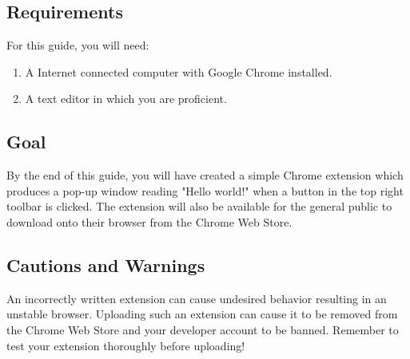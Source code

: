\documentclass[11pt]{article}
\begin{document}
\subsection{Requirements}

For this guide, you will need:

\begin{enumerate}
	\item A Internet connected computer with Google Chrome installed.
	\item A text editor in which you are proficient.
\end{enumerate}

\subsection{Goal}

By the end of this guide, you will have created a simple Chrome extension which produces a pop-up window reading "Hello world!" when a button in the top right toolbar is clicked. The extension will also be available for the general public to download onto their browser from the Chrome Web Store.

\subsection{Cautions and Warnings}

An incorrectly written extension can cause undesired behavior resulting in an unstable browser. Uploading such an extension can cause it to be removed from the Chrome Web Store and your developer account to be banned. Remember to test your extension thoroughly before uploading!
\end{document}

